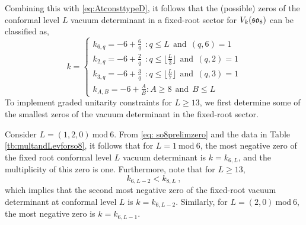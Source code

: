 Combining this with \eqref{eq:AtconsttypeD}, it follows that the (possible) zeros of the conformal level $L$ vacuum determinant in a fixed-root sector for $V_k(\mathfrak{so}_8)$ can be classified as,
\begin{equation} \label{eq: so8prelimzero}
    k = \begin{cases}
        k_{6,q} = -6 + \frac{6}{q} \ \ : q \leqslant L \ \ \text{and} \ \ (q,6)=1 \\ 
        k_{2,q} = -6 + \frac{2}{q} \ \ : q \leqslant \lfloor \frac{L}{3} \rfloor \ \ \text{and} \ \ (q,2)=1 \\
        k_{3,q} = -6 + \frac{3}{q} \ \ : q \leqslant \lfloor \frac{L}{7} \rfloor \ \ \text{and} \ \ (q,3)=1 \\
        k_{A,B} = -6 + \frac{A}{B}: A \geqslant 8 \ \ \text{and} \ \ B \leqslant L
    \end{cases}
\end{equation}
To implement graded unitarity constraints for $L \geqslant 13$, we first determine some of the smallest zeros of the vacuum determinant in the fixed-root sector. 

Consider $L = (1,2,0)~\textrm{mod}~6$. From \eqref{eq: so8prelimzero} and the data in Table \ref{tb:multandLevforso8}, it follows that for $L = 1~\textrm{mod}~6$, the most negative zero of the fixed root conformal level $L$ vacuum determinant is $k = k_{6,L}$, and the multiplicity of this zero is one. Furthermore, note that for $L \geqslant 13$,
\begin{equation} \label{eq:so8inequality}
    k_{6,L-2} < k_{8,L}~,
\end{equation}
which implies that the second most negative zero of the fixed-root vacuum determinant at conformal level $L$ is $k = k_{6,L-2}$. Similarly, for $L = (2,0)~\textrm{mod}~6$, the most negative zero is $k = k_{6,L-1}$. 

